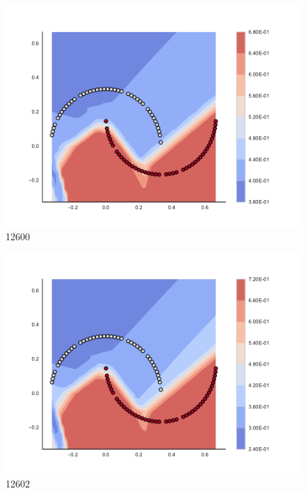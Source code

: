 \begin{subfigure}[b]{0.09\textwidth}
    \includegraphics[clip, trim=2.35cm 1.75cm 4.5cm 0cm,width=\textwidth]{img/convergence/12600.pdf}
    \caption{12600}
    \label{fig:convergence_12600}
\end{subfigure}
%
\begin{subfigure}[b]{0.09\textwidth}
    \includegraphics[clip, trim=2.35cm 1.75cm 4.5cm 0cm,width=\textwidth]{img/convergence/12602.pdf}
    \caption{12602}
    \label{fig:convergence_12602}
\end{subfigure}
%
